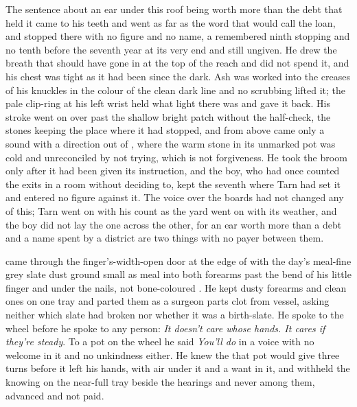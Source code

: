 The sentence about an ear under this roof being worth more than the debt that held it came to his teeth and went as far as the word that would call the loan, and stopped there with no figure and no name, a remembered ninth stopping and no tenth before the seventh year at its very end and still ungiven. He drew the breath that should have gone in at the top of the reach and did not spend it, and his chest was tight as it had been since the dark. Ash was worked into the creases of his knuckles in the colour of the clean dark line and no scrubbing lifted it; the pale clip-ring at his left wrist held what light there was and gave it back. His stroke went on over  past the shallow bright patch without the half-check, the stones keeping the place where it had stopped, and from above came only a sound with a direction out of , where the warm stone in its unmarked pot was cold and unreconciled by not trying, which is not forgiveness. He took the broom only after it had been given its instruction, and the boy, who had once counted the exits in a room without deciding to, kept the seventh where Tarn had set it and entered no figure against it. The voice over the boards had not changed any of this; Tarn went on with his count as the yard went on with its weather, and the boy did not lay the one across the other, for an ear worth more than a debt and a name spent by a district are two things with no payer between them.

\scenebreak

 came through the finger's-width-open door at the edge of  with the day's meal-fine grey slate dust ground small as meal into both forearms past the bend of his little finger and under the nails, not bone-coloured . He kept dusty forearms and clean ones on one tray and parted them as a surgeon parts clot from vessel, asking neither which slate had broken nor whether it was a birth-slate. He spoke to the wheel before he spoke to any person: \emph{It doesn't care whose hands. It cares if they're steady}. To a pot on the wheel he said \emph{You'll do} in a voice with no welcome in it and no unkindness either. He knew the  that pot would give three turns before it left his hands, with air under it and a want in it, and withheld the knowing on the near-full tray beside the hearings and never among them, advanced and not paid.

